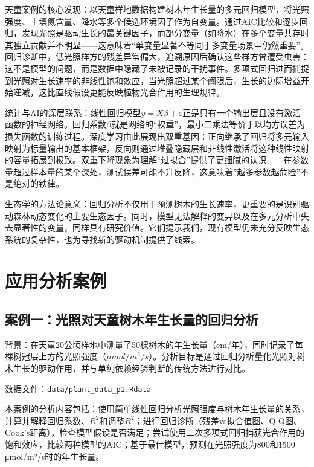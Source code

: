 \documentclass[
  twoside,12pt,fontset=none]{ctexbook}
\begin{document}
天童案例的核心发现：以天童样地数据构建树木年生长量的多元回归模型，将光照强度、土壤氮含量、降水等多个候选环境因子作为自变量。通过AIC比较和逐步回归，发现光照是驱动生长的最关键因子，而部分变量（如降水）在多个变量共存时其独立贡献并不明显------这意味着``单变量显著不等同于多变量场景中仍然重要''。回归诊断中，低光照样方的残差异常偏大，追溯原因后确认这些样方曾遭受虫害：这不是模型的问题，而是数据中隐藏了未被记录的干扰事件。多项式回归进而捕捉到光照对生长速率的非线性饱和效应，当光照超过某个阈限后，生长的边际增益开始递减，这比直线假设更能反映植物光合作用的生理规律。

统计与AI的深层联系：线性回归模型\(y = X\beta + \varepsilon\)正是只有一个输出层且没有激活函数的神经网络。回归系数\(\beta\)就是网络的``权重''，最小二乘法等价于以均方误差为损失函数的训练过程。深度学习由此展现出双重基因：正向继承了回归将多元输入映射为标量输出的基本框架，反向则通过堆叠隐藏层和非线性激活将这种线性映射的容量拓展到极致。双重下降现象为理解``过拟合''提供了更细腻的认识------在参数量超过样本量的某个深处，测试误差可能不升反降，这意味着''越多参数越危险''不是绝对的铁律。

生态学的方法论意义：回归分析不仅用于预测树木的生长速率，更重要的是识别驱动森林动态变化的主要生态因子。同时，模型无法解释的变异以及在多元分析中失去显著性的变量，同样具有研究价值。它们提示我们，现有模型仍未充分反映生态系统的复杂性，也为寻找新的驱动机制提供了线索。

\hypertarget{ux5e94ux7528ux5206ux6790ux6848ux4f8b-6}{%
\section{应用分析案例}\label{ux5e94ux7528ux5206ux6790ux6848ux4f8b-6}}

\hypertarget{ux6848ux4f8bux4e00ux5149ux7167ux5bf9ux5929ux7ae5ux6811ux6728ux5e74ux751fux957fux91cfux7684ux56deux5f52ux5206ux6790}{%
\subsection{案例一：光照对天童树木年生长量的回归分析}\label{ux6848ux4f8bux4e00ux5149ux7167ux5bf9ux5929ux7ae5ux6811ux6728ux5e74ux751fux957fux91cfux7684ux56deux5f52ux5206ux6790}}

背景：在天童20公顷样地中测量了50棵树木的年生长量（cm/年），同时记录了每棵树冠层上方的光照强度（\(\mu mol/ m^2 /s\)）。分析目标是通过回归分析量化光照对树木生长的驱动作用，并与单纯依赖经验判断的传统方法进行对比。

数据文件：\texttt{data/plant\_data\_p1.Rdata}

本案例的分析内容包括：使用简单线性回归分析光照强度与树木年生长量的关系，计算并解释回归系数、\(R^2\)和调整\(R^2\)；进行回归诊断（残差vs拟合值图、Q-Q图、Cook's距离），检查模型假设是否满足；尝试使用二次多项式回归捕获光合作用的饱和效应，比较两种模型的AIC；基于最佳模型，预测在光照强度为800和1500 μmol/m²/s时的年生长量。
\end{document}
